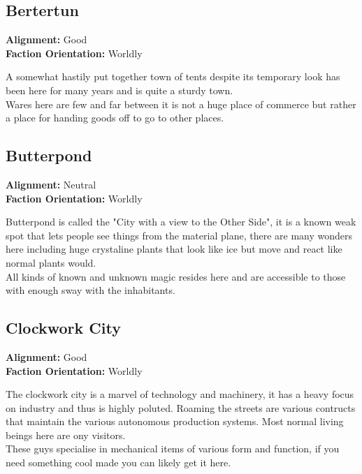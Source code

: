 \documentclass[10pt,twoside,twocolumn]{article}
\begin{document}
\subsection{Bertertun}
\textbf{Alignment:} Good \\
\textbf{Faction Orientation:} Worldly \\
\begin{quotebox}
	A somewhat hastily put together town of tents despite its temporary look has been here for many years and is quite a sturdy town. \\

	Wares here are few and far between it is not a huge place of commerce but rather a place for handing goods off to go to other places. \\
\end{quotebox}

\subsection{Butterpond}
\textbf{Alignment:} Neutral \\
\textbf{Faction Orientation:} Worldly \\
\begin{quotebox}
	Butterpond is called the "City with a view to the Other Side", it is a known weak spot that lets people see things from the material plane, there are many wonders here including huge crystaline plants that look like ice but move and react like normal plants would. \\

	All kinds of known and unknown magic resides here and are accessible to those with enough sway with the inhabitants. \\
\end{quotebox}

\subsection{Clockwork City}
\textbf{Alignment:} Good \\
\textbf{Faction Orientation:} Worldly \\
\begin{quotebox}
	The clockwork city is a marvel of technology and machinery, it has a heavy focus on industry and thus is highly poluted. Roaming the streets are various contructs that maintain the various autonomous production systems. Most normal living beings here are ony visitors. \\

	These guys specialise in mechanical items of various form and function, if you need something cool made you can likely get it here. \\
\end{quotebox}
\end{document}

